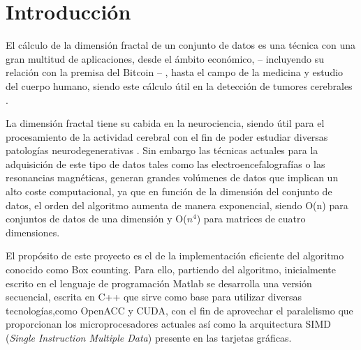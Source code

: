 \chapter{Introducción}


El cálculo de la dimensión fractal de un conjunto de datos es una técnica con una gran multitud de aplicaciones, desde el ámbito económico, -- incluyendo su relación con la premisa del Bitcoin --  {\cite{delfin2016fractal}}, hasta el campo de la medicina y estudio del cuerpo humano, siendo este cálculo útil en la detección de tumores cerebrales {\cite{iftekharuddin2009fractal}}.

La dimensión fractal tiene su cabida en la neurociencia, siendo útil para el procesamiento de la actividad cerebral con el fin de poder estudiar diversas patologías neurodegenerativas \cite{fernandez2001use}. Sin embargo las técnicas actuales para la adquisición de este tipo de datos tales como las electroencefalografías o las resonancias magnéticas, generan grandes volúmenes de datos que implican un alto coste computacional, ya que en función de la dimensión del conjunto de datos, el orden del algoritmo aumenta de manera exponencial, siendo O(n) para conjuntos de datos de una dimensión y O($n^{4}$)  para matrices de cuatro dimensiones.

El propósito de este proyecto es el de la implementación eficiente del algoritmo conocido como Box counting. Para ello, partiendo del algoritmo, inicialmente escrito en el lenguaje de programación Matlab se desarrolla una versión secuencial, escrita en C++ que sirve como base para utilizar diversas tecnologías,como OpenACC y CUDA, con el fin de aprovechar el paralelismo que proporcionan los microprocesadores actuales así como la arquitectura SIMD (\textit{Single Instruction Multiple Data}) presente en las tarjetas gráficas.